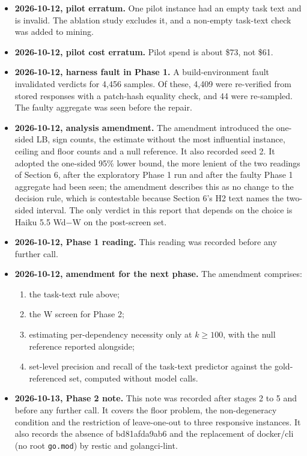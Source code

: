 \documentclass[10pt]{article}
\begin{document}
\begin{itemize}
\item \textbf{2026-10-12, pilot erratum.} One pilot instance had an empty task text and is invalid. The ablation study excludes it, and a non-empty task-text check was added to mining.
\item \textbf{2026-10-12, pilot cost erratum.} Pilot spend is about \$73, not \$61.
\item \textbf{2026-10-12, harness fault in Phase 1.} A build-environment fault invalidated verdicts for 4,456 samples. Of these, 4,409 were re-verified from stored responses with a patch-hash equality check, and 44 were re-sampled. The faulty aggregate was seen before the repair.
\item \textbf{2026-10-12, analysis amendment.} The amendment introduced the one-sided LB, sign counts, the estimate without the most influential instance, ceiling and floor counts and a null reference. It also recorded seed 2. It adopted the one-sided 95\% lower bound, the more lenient of the two readings of Section 6, after the exploratory Phase 1 run and after the faulty Phase 1 aggregate had been seen; the amendment describes this as no change to the decision rule, which is contestable because Section 6's H2 text names the two-sided interval. The only verdict in this report that depends on the choice is Haiku 5.5 Wd$-$W on the post-screen set.
\item \textbf{2026-10-12, Phase 1 reading.} This reading was recorded before any further call.
\item \textbf{2026-10-12, amendment for the next phase.} The amendment comprises:
  \begin{enumerate}
  \item[(i)] the task-text rule above;
  \item[(ii)] the W screen for Phase 2;
  \item[(iii)] estimating per-dependency necessity only at $k \geq 100$, with the null reference reported alongside;
  \item[(iv)] set-level precision and recall of the task-text predictor against the gold-referenced set, computed without model calls.
  \end{enumerate}
\item \textbf{2026-10-13, Phase 2 note.} This note was recorded after stages 2 to 5 and before any further call. It covers the floor problem, the non-degeneracy condition and the restriction of leave-one-out to three responsive instances. It also records the absence of bd81afda9ab6 and the replacement of docker/cli (no root \texttt{go.mod}) by restic and golangci-lint.

\end{itemize}
\end{document}

